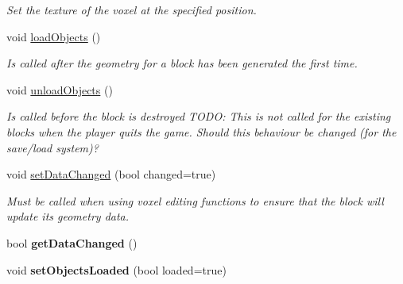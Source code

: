 \begin{DoxyCompactItemize}
\begin{DoxyCompactList}\small\item\em \-Set the texture of the voxel at the specified position. \end{DoxyCompactList}\item 
\hypertarget{classVoxelBlock_ad75047dc35205b32787e2dfd6abba2c0}{
void \hyperlink{classVoxelBlock_ad75047dc35205b32787e2dfd6abba2c0}{load\-Objects} ()}
\label{d1/d83/classVoxelBlock_ad75047dc35205b32787e2dfd6abba2c0}

\begin{DoxyCompactList}\small\item\em \-Is called after the geometry for a block has been generated the first time. \end{DoxyCompactList}\item 
\hypertarget{classVoxelBlock_a6677b614c3c684ea648835809e48d9ef}{
void \hyperlink{classVoxelBlock_a6677b614c3c684ea648835809e48d9ef}{unload\-Objects} ()}
\label{d1/d83/classVoxelBlock_a6677b614c3c684ea648835809e48d9ef}

\begin{DoxyCompactList}\small\item\em \-Is called before the block is destroyed \-T\-O\-D\-O\-: \-This is not called for the existing blocks when the player quits the game. \-Should this behaviour be changed (for the save/load system)? \end{DoxyCompactList}\item 
\hypertarget{classVoxelBlock_ab057689d557569700f85c3b75d9adc15}{
void \hyperlink{classVoxelBlock_ab057689d557569700f85c3b75d9adc15}{set\-Data\-Changed} (bool changed=true)}
\label{d1/d83/classVoxelBlock_ab057689d557569700f85c3b75d9adc15}

\begin{DoxyCompactList}\small\item\em \-Must be called when using voxel editing functions to ensure that the block will update its geometry data. \end{DoxyCompactList}\item 
\hypertarget{classVoxelBlock_a2afb429fea7249aacc36ee0ca4dee006}{
bool {\bfseries get\-Data\-Changed} ()}
\label{d1/d83/classVoxelBlock_a2afb429fea7249aacc36ee0ca4dee006}

\item 
\hypertarget{classVoxelBlock_aaa3f4c47c2120699c5c8828ef0051c7b}{
void {\bfseries set\-Objects\-Loaded} (bool loaded=true)}
\label{d1/d83/classVoxelBlock_aaa3f4c47c2120699c5c8828ef0051c7b}


\end{DoxyCompactItemize}
